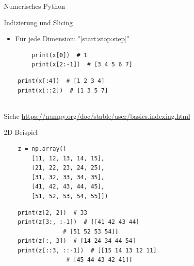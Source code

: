 \documentclass[utf8, smaller, c]{beamer}
\begin{document}
\begin{frame}{Numerisches Python}
    \begin{block}{Indizierung und Slicing}
        \begin{itemize}
            \item Für jede Dimension: "[start:stop:step]"
        \end{itemize}
        \begin{minipage}{0.45\linewidth}
            \begin{lstlisting}
        print(x[0])  # 1
        print(x[2:-1])  # [3 4 5 6 7]
            \end{lstlisting}
        \end{minipage}
        \begin{minipage}{0.4\linewidth}
            \begin{lstlisting}
    print(x[:4])  # [1 2 3 4]
    print(x[::2])  # [1 3 5 7]
            \end{lstlisting}
        \end{minipage}
        \\Siehe {\footnotesize\url{https://numpy.org/doc/stable/user/basics.indexing.html}}
    \end{block}
    \vspace*{-3mm}
    \begin{block}{2D Beispiel}
        \begin{minipage}{0.4\linewidth}
        \begin{lstlisting}
    z = np.array([
        [11, 12, 13, 14, 15],
        [21, 22, 23, 24, 25],
        [31, 32, 33, 34, 35],
        [41, 42, 43, 44, 45],
        [51, 52, 53, 54, 55]])
        \end{lstlisting}
        \end{minipage}
        \begin{minipage}{0.5\linewidth}
        \begin{lstlisting}
    print(z[2, 2])  # 33
    print(z[3:, :-1])  # [[41 42 43 44]
                 # [51 52 53 54]]
    print(z[:, 3])  # [14 24 34 44 54]
    print(z[::3, ::-1])  # [[15 14 13 12 11]
                  # [45 44 43 42 41]]
        \end{lstlisting}
        \end{minipage}
    \end{block}
    
    \pagebreak
    

\end{frame}
\end{document}

